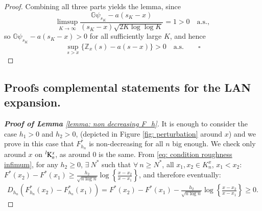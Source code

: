 \begin{proof}
Combining all three parts yields the lemma, since
\[
  \limsup_{K\to\infty}
  \frac{\mathbb{G}\psi_{s_K}-a(s_K-x)}{(s_K-x)\sqrt{2K\log\log K}}=1>0
  \quad\text{a.s.},
\]
so $\mathbb{G}\psi_{s_K}-a(s_K-x)>0$ for all sufficiently large $K$, and hence
\[
  \sup_{s>x}\bigl\{\mathbb{Z}_x(s)-a(s-x)\bigr\}>0\quad\text{a.s.}\qquad\square
\]
\end{proof}

\subsection{Proofs complemental statements for the LAN expansion. }\label{appendix: statements LAN}
\begin{proof}[\hypertarget{proof of lemma 5}{\textbf{Proof of Lemma}} \ref{lemma: non decreasing F_h}]
It is enough to consider the case $h_1 > 0$ and $h_2 > 0$, (depicted in Figure \ref{fig: perturbation} around $x$) and we prove in this case that $F^*_{h_n}$ is non-decreasing for all $n$ big enough. We check only around $x$ on $\prescript{l}{}{\mathrm{K}^x_n}$, as around $0$ is the same. From \eqref{eq: condition roughness infimum}, for any $h_2 \geq 0$, $\exists \: N^*$ such that $\forall \: n \geq N^*$, all $x_1, x_2 \in K^x_n$, $x_1 < x_2$: $F^*(x_2)-F^*(x_1) \geq \frac{h_2}{\sqrt{n\log{n}}} \log{\left\{\frac{x-x_2}{x-x_1} \right\}}$,
and therefore eventually:
\begin{align*}
    D_{h_n} \left( F^*_{h_n}(x_2) - F^*_{h_n} (x_1) \right) = F^*(x_2)-F^*(x_1) - \frac{h_2}{\sqrt{n\log{n}}} \log{\left\{\frac{x-x_2}{x-x_1} \right\}} \geq 0. 
\end{align*}
\end{proof}

